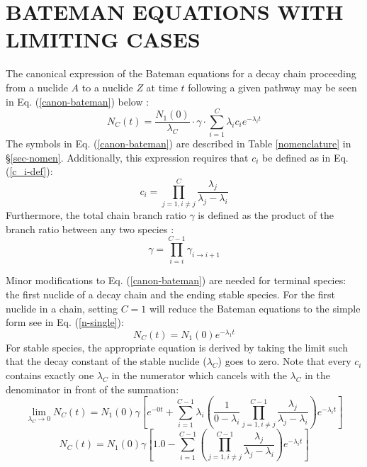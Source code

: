 \documentclass[letterpaper]{physor2018}
\begin{document}
\section{BATEMAN EQUATIONS WITH LIMITING CASES}
\label{sec-normal-method}
The canonical expression of the Bateman equations for a decay chain
proceeding from a nuclide $A$ to a nuclide $Z$ at time
$t$ following a given pathway may be seen in Eq. (\ref{canon-bateman}) below \cite{CETNAR2006640}:
\begin{equation}
\label{canon-bateman}
N_C(t) = \frac{N_1(0)}{\lambda_C} \cdot \gamma \cdot \sum_{i=1}^C \lambda_i c_{i} e^{-\lambda_i t}
\end{equation}
The symbols in Eq. (\ref{canon-bateman}) are described in
Table \ref{nomenclature} in \S\ref{sec-nomen}. Additionally, this expression requires that
$c_{i}$ be defined as in Eq. (\ref{c_i-def}):
\begin{equation}
\label{c_i-def}
c_i = \prod_{j=1,i\ne j}^C \frac{\lambda_j}{\lambda_j - \lambda_i}
\end{equation}
Furthermore, the total chain branch ratio $\gamma$ is defined as the product of the
branch ratio between any two species \cite{harr2007precise}:
\begin{equation}
\label{gamma-total}
\gamma = \prod_{i=i}^{C-1} \gamma_{i \to i+1}
\end{equation}

Minor modifications to Eq. (\ref{canon-bateman}) are needed for terminal species:
the first nuclide of a decay chain and the ending stable species. For the first nuclide in a chain,
setting $C=1$ will reduce the Bateman equations to the simple form see in Eq. (\ref{n-single}):
\begin{equation}
\label{n-single}
N_C(t) = N_1(0) e^{-\lambda_1 t}
\end{equation}
For stable species, the appropriate equation is derived by taking the limit
such that the decay constant of the stable nuclide ($\lambda_C$) goes to
zero. Note that every $c_i$ contains exactly one $\lambda_C$
in the numerator which cancels with the $\lambda_C$ in the denominator
in front of the summation:
\begin{equation}
\label{stable-lim}
\lim_{\lambda_C \to 0} N_C(t) = N_1(0)  \gamma \left[e^{-0t} + \sum_{i=1}^{C-1} \lambda_i \left(\frac{1}{0 - \lambda_i} \prod_{j=1,i\ne j}^{C-1} \frac{\lambda_j}{\lambda_j - \lambda_i} \right) e^{-\lambda_i t} \right]
\end{equation}
\begin{equation}
\label{n-stable}
N_C(t) = N_1(0)  \gamma \left[1.0 - \sum_{i=1}^{C-1} \left(\prod_{j=1,i\ne j}^{C-1} \frac{\lambda_j}{\lambda_j - \lambda_i} \right) e^{-\lambda_i t} \right]
\end{equation}
\end{document}
